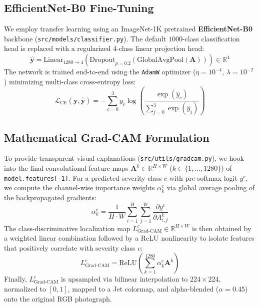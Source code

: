 \documentclass[11pt,a4paper]{article}
\begin{document}
\subsection{EfficientNet-B0 Fine-Tuning}
We employ transfer learning using an ImageNet-1K pretrained \textbf{EfficientNet-B0} backbone (\texttt{src/models/classifier.py}). The default $1000$-class classification head is replaced with a regularized 4-class linear projection head:
\begin{equation}
    \hat{\bm{y}} = \text{Linear}_{1280 \to 4}\!\left(\text{Dropout}_{p=0.2}\!\left(\text{GlobalAvgPool}(\bm{A})\right)\right) \in \mathbb{R}^4
\end{equation}
The network is trained end-to-end using the \texttt{AdamW} optimizer ($\eta = 10^{-4}$, $\lambda = 10^{-2}$) minimizing multi-class cross-entropy loss:
\begin{equation}
    \mathcal{L}_{\text{CE}}(\bm{y}, \hat{\bm{y}}) = -\sum_{c=0}^{3} y_c \log \left( \frac{\exp(\hat{y}_c)}{\sum_{j=0}^{3} \exp(\hat{y}_j)} \right)
\end{equation}

\subsection{Mathematical Grad-CAM Formulation}
To provide transparent visual explanations (\texttt{src/utils/gradcam.py}), we hook into the final convolutional feature maps $\bm{A}^k \in \mathbb{R}^{H \times W}$ ($k \in \{1,\dots,1280\}$) of \texttt{model.features[-1]}. For a predicted severity class $c$ with pre-softmax logit $y^c$, we compute the channel-wise importance weights $\alpha_k^c$ via global average pooling of the backpropagated gradients:
\begin{equation}
    \alpha_k^c = \frac{1}{H \cdot W} \sum_{i=1}^{H} \sum_{j=1}^{W} \frac{\partial y^c}{\partial A_{i,j}^k}
\end{equation}
The class-discriminative localization map $L_{\text{Grad-CAM}}^c \in \mathbb{R}^{H \times W}$ is then obtained by a weighted linear combination followed by a ReLU nonlinearity to isolate features that positively correlate with severity class $c$:
\begin{equation}
    L_{\text{Grad-CAM}}^c = \text{ReLU}\!\left( \sum_{k=1}^{1280} \alpha_k^c \bm{A}^k \right)
\end{equation}
Finally, $L_{\text{Grad-CAM}}^c$ is upsampled via bilinear interpolation to $224 \times 224$, normalized to $[0, 1]$, mapped to a Jet colormap, and alpha-blended ($\alpha = 0.45$) onto the original RGB photograph.
\end{document}
